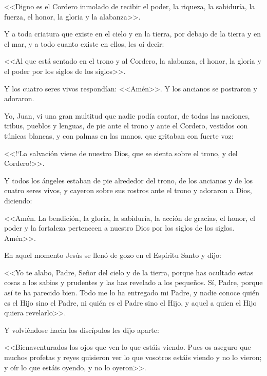 <<Digno es el Cordero inmolado 
de recibir el poder, la riqueza, la sabiduría, la 
fuerza, el honor, la gloria y la alabanza>>. 

 Y a 
toda criatura que existe en el cielo y en la 
tierra, por debajo de la tierra y en el mar, y a 
todo cuanto existe en ellos, les oí decir:  

<<Al 
que está sentado en el trono y al Cordero, la 
alabanza, el honor, la gloria y el poder por los 
siglos de los siglos>>. 

 Y los cuatro seres vivos 
respondían: <<Amén>>. Y los ancianos se 
postraron y adoraron. 





 Yo, Juan, vi una gran multitud que nadie 
podía contar, de todas las naciones, tribus, 
pueblos y lenguas, de pie ante el trono y ante 
el Cordero, vestidos con túnicas blancas, y con 
palmas en las manos, que gritaban con fuerte 
voz:  

<<!`La salvación viene de nuestro Dios, que 
se sienta sobre el trono, y del Cordero!>>.  

Y 
todos los ángeles estaban de pie alrededor del 
trono, de los ancianos y de los cuatro seres 
vivos, y cayeron sobre sus rostros ante el trono 
y adoraron a Dios, diciendo:  

<<Amén.  La 
bendición, la gloria, la sabiduría, la acción de 
gracias, el honor, el poder y la fortaleza 
pertenecen a nuestro Dios por los siglos de los 
siglos. Amén>>. 




 En aquel momento Jesús se llenó de gozo en el 
Espíritu Santo y dijo:  

<<Yo te alabo, Padre, 
Señor del cielo y de la tierra, porque has 
ocultado estas cosas a los sabios y prudentes y 
las has revelado a los pequeños. Sí, Padre, 
porque así te ha parecido bien. Todo me lo ha 
entregado mi Padre, y nadie conoce quién es el 
Hijo sino el Padre, ni quién es el Padre sino el 
Hijo, y aquel a quien el Hijo quiera revelarlo>>. 

 
Y volviéndose hacia los discípulos les dijo 
aparte:  

<<Bienaventurados los ojos que ven lo 
que estáis viendo. Pues os aseguro que 
muchos profetas y reyes quisieron ver lo que 
vosotros estáis viendo y no lo vieron; y oír lo 
que estáis oyendo, y no lo oyeron>>. 

